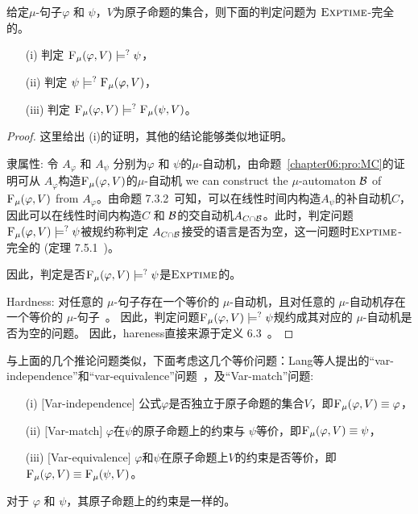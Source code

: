 \begin{theorem}[Entailment]
	\label{thm:Ent}
	给定$\mu$-句子$\varphi$ 和 $\psi$，$V$为原子命题的集合，则下面的判定问题为 $\textsc{Exptime}$-完全的。
	\begin{itemize}
		\item[(i)] 判定  ${\textsc{F}_{\textsc{$\mu$}}}(\varphi, V ) \models^? \psi$，
		\item[(ii)] 判定  $\psi \models^? {\textsc{F}_{\textsc{$\mu$}}}(\varphi, V)$，
		\item[(iii)] 判定 ${\textsc{F}_{\textsc{$\mu$}}}(\varphi, V) \models^? {\textsc{F}_{\textsc{$\mu$}}}(\psi, V)$。
	\end{itemize}
\end{theorem}
\begin{proof}
	这里给出 (i)的证明，其他的结论能够类似地证明。
	
	
	隶属性: 令 $A_{\varphi}$ 和 $A_{\psi}$ 分别为$\varphi$ 和 $\psi$的$\mu$-自动机，由命题~\ref{chapter06:pro:MC}的证明可从 $A_{\varphi}$构造${\textsc{F}_{\textsc{$\mu$}}}(\varphi, V )$的$\mu$-自动机 we can construct the $\mu$-automaton ${\cal B}$ of ${\textsc{F}_{\textsc{$\mu$}}}(\varphi, V )$ from $A_{\varphi}$。由命题 7.3.2~\cite{comon1997tree}可知，可以在线性时间内构造$A_\psi$的补自动机$C$，因此可以在线性时间内构造$C$ 和 ${\cal B}$的交自动机$A_{C \cap {\cal B}}$。此时，判定问题 ${\textsc{F}_{\textsc{$\mu$}}}(\varphi, V ) \models^? \psi$被规约称判定 $A_{C \cap {\cal B}}$接受的语言是否为空，这一问题时$\textsc{Exptime}$-完全的 (定理 7.5.1~\cite{comon1997tree})。
	
	因此，判定是否${\textsc{F}_{\textsc{$\mu$}}}(\varphi, V ) \models^? \psi$是$\textsc{Exptime}$的。 
	
	Hardness: 对任意的 $\mu$-句子存在一个等价的 $\mu$-自动机，且对任意的 $\mu$-自动机存在一个等价的 $\mu$-句子~\cite{bradfield2018mu}。
因此，判定问题${\textsc{F}_{\textsc{$\mu$}}}(\varphi, V ) \models^? \psi$规约成其对应的 $\mu$-自动机是否为空的问题。
	因此，hareness直接来源于定义 6.3~\cite{DBLP:journals/siamcomp/EmersonJ99}。
\end{proof}

与上面的几个推论问题类似，下面考虑这几个等价问题：Lang等人提出的“var-independence”和“var-equivalence”问题~\cite{lang2003propositional}，及“Var-match”问题:
\begin{itemize}
	\item[(i)] $[$Var-independence$]$ 公式$\varphi$是否独立于原子命题的集合$V$，即${\textsc{F}_{\textsc{$\mu$}}}(\varphi,V) \equiv \varphi$，
	\item[(ii)] $[$Var-match$]$  $\varphi$在$\psi$的原子命题上的约束与 $\psi$等价，即${\textsc{F}_{\textsc{$\mu$}}}(\varphi, V) \equiv \psi$，
	\item[(iii)] $[$Var-equivalence$]$  $\varphi$和$\psi$在原子命题上$V$的约束是否等价，即${\textsc{F}_{\textsc{$\mu$}}}(\varphi, V) \equiv {\textsc{F}_{\textsc{$\mu$}}}(\psi, V)$。
\end{itemize}
对于 $\varphi$ 和 $\psi$，其原子命题上的约束是一样的。

